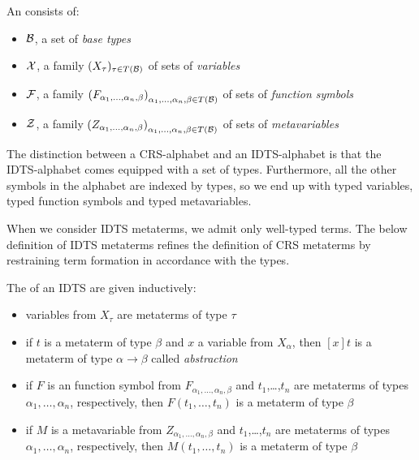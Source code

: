 \begin{definition}
  An  consists of:
  \begin{itemize}
  \item $\mathcal{B}$, a set of \emph{base types}
  \item $\mathcal{X}$, a family $(X_\tau)_{\tau \in T(\mathcal{B})}$ of sets of \emph{variables}
  \item $\mathcal{F}$, a family ${(F_{\alpha_1,\ldots,\alpha_n,\beta})}_{\alpha_1,\ldots,\alpha_n,\beta \in T(\mathcal{B})}$ of sets of \emph{function symbols}
  \item $\mathcal{Z}$, a family ${(Z_{\alpha_1,\ldots,\alpha_n,\beta})}_{\alpha_1,\ldots,\alpha_n,\beta \in T(\mathcal{B})}$ of sets of
    \emph{metavariables}
  \end{itemize}
\end{definition}

The distinction between a CRS-alphabet and an IDTS-alphabet is that the
IDTS-alphabet comes equipped with a set of types. Furthermore, all the
other symbols in the alphabet are indexed by types, so we end up with typed
variables, typed function symbols and typed metavariables.

When we consider IDTS metaterms, we admit only well-typed terms. The below
definition of IDTS metaterms refines the definition of CRS metaterms by
restraining term formation in accordance with the types.

\begin{definition}
  The  of an IDTS are given inductively:
  \begin{itemize}
  \item variables from $X_\tau$ are metaterms of type $\tau$
  \item if $t$ is a metaterm of type $\beta$ and $x$ a variable from
    $X_\alpha$, then $[x]t$ is a metaterm of type $\alpha \to \beta$ called
    \emph{abstraction}
  \item if $F$ is an function symbol from
    $F_{\alpha_1,\ldots,\alpha_n,\beta}$ and $t_1$,\ldots,$t_n$ are
    metaterms of types $\alpha_1,\ldots,\alpha_n$, respectively, then
    $F(t_1,\ldots,t_n)$ is a metaterm of type $\beta$
  \item if $M$ is a metavariable from $Z_{\alpha_1,\ldots,\alpha_n,\beta}$
    and $t_1$,\ldots,$t_n$ are metaterms of types
    $\alpha_1,\ldots,\alpha_n$, respectively, then $M(t_1,\ldots,t_n)$ is a
    metaterm of type $\beta$
  \end{itemize}
\end{definition}

